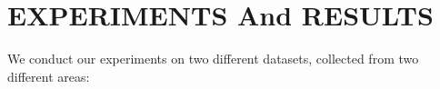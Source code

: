 \documentclass{article}
\newcommand{\x}{\mathbf{x}}
\newcommand{\bea}{\mathbf{b}}
\begin{document}
	\section{EXPERIMENTS And RESULTS}
	\label{sec:experiments}
	We conduct our experiments on two different datasets, collected from two different areas:  
\end{document}
